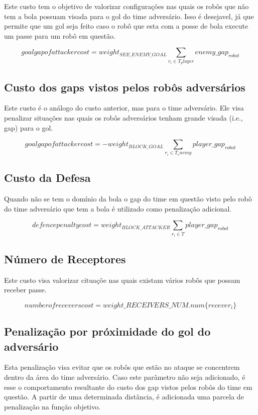 Este custo tem o objetivo de valorizar configurações nas quais
os robôs que não tem a bola possuam visada para o gol do time
adversário. Isso
é desejavel, já que permite que um gol seja feito caso o robô
que esta com a posse de bola execute um passe para um robô
em questão.

\begin{dmath}
   goal gap of attacker cost = weight_{SEE{\_}ENEMY{\_}GOAL}
    \sum_{r_i \in T_player} enemy{\_}gap_{robot}
\end{dmath}

\subsection{Custo dos gaps vistos pelos robôs adversários}

Este custo é o análogo do custo anterior, mas para o
time adversário. Ele visa penalizar situações nas quais
os robôs adversários tenham grande visada (i.e., gap)
para o gol. 

\begin{dmath}
   goal gap of attacker cost = - weight_{BLOCK{\_}GOAL}
    \sum_{r_i \in T_enemy} player{\_}gap_{robot}
\end{dmath}

\subsection{Custo da Defesa}
Quando não se tem o domínio da bola o gap do time em questão
visto pelo robô do time adversário que tem a bola é utilizado
como penalização adicional.

\begin{dmath}
  defence penalty cost = weight_{BLOCK{\_}ATTACKER}
   \sum_{r_i \in T} player{\_}gap_{robot}
\end{dmath}

\subsection{Número de Receptores}

Este custo visa valorizar cituaçõe nas quais existam
vários robôs que possam receber passe.

\begin{dmath}
  number of recevers cost = weight{\_}RECEIVERS{\_}NUM . 
   num \lbrace recever_i \rbrace
\end{dmath}

\subsection{Penalização por próximidade do gol do adversário}
Esta penalização visa evitar que os robôs que estão no ataque
se concentrem dentro da área do time adversário. Caso este
parâmetro não seja adicionado, é esse o comportamento resultante
do custo dos gap vistos pelos robôs do time em questão. 
A partir de uma determinada distância, é adicionada uma parcela
de penalização na função objetivo.

